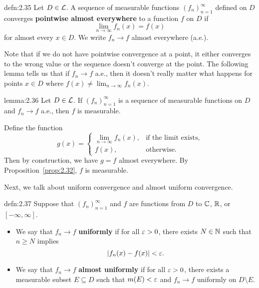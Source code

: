 \begin{defn}{defn:2.35}
    Let $D \in {\cal L}$. A sequence of measurable functions $(f_n)_{n=1}^\infty$
    defined on $D$ converges {\bf pointwise almost everywhere} to a function 
    $f$ on $D$ if 
    \[ \lim_{n\to\infty} f_n(x) = f(x) \] 
    for almost every $x \in D$. We write $f_n \to f$ almost everywhere (a.e.). 
\end{defn}

Note that if we do not have pointwise convergence at a point, it 
either converges to the wrong value or the sequence doesn't converge 
at the point. The following lemma tells us that if $f_n \to f$ a.e., 
then it doesn't really matter what happens for points $x \in D$ where
$f(x) \neq \lim_{n\to\infty} f_n(x)$. 

\begin{lemma}{lemma:2.36}
    Let $D \in {\cal L}$. If $(f_n)_{n=1}^\infty$ is a sequence of measurable 
    functions on $D$ and $f_n \to f$ a.e., then $f$ is measurable. 
\end{lemma}
\begin{pf}
    Define the function 
    \[ g(x) = \begin{cases}
        \lim_{n\to\infty} f_n(x), & \text{if the limit exists,} \\ 
        f(x), & \text{otherwise.} 
    \end{cases} \] 
    Then by construction, we have $g = f$ almost everywhere. By 
    Proposition~\ref{prop:2.32}, $f$ is measurable. 
\end{pf}

Next, we talk about uniform convergence and almost uniform convergence. 

\begin{defn}{defn:2.37}
    Suppose that $(f_n)_{n=1}^\infty$ and $f$ are functions from $D$ 
    to $\mathbb{C}$, $\mathbb{R}$, or $[-\infty, \infty]$. 
    \begin{itemize}
        \item We say that $f_n \to f$ {\bf uniformly} if for all $\varepsilon > 0$, 
        there exists $N \in \mathbb{N}$ such that $n \geq N$ implies
        \[ |f_n(x) - f(x)| < \varepsilon. \] 
        \item We say that $f_n \to f$ {\bf almost uniformly} if for all 
        $\varepsilon > 0$, there exists a measurable subset $E \subseteq D$ such that 
        $m(E) < \varepsilon$ and $f_n \to f$ uniformly on $D \setminus E$. 
    \end{itemize}
\end{defn}

